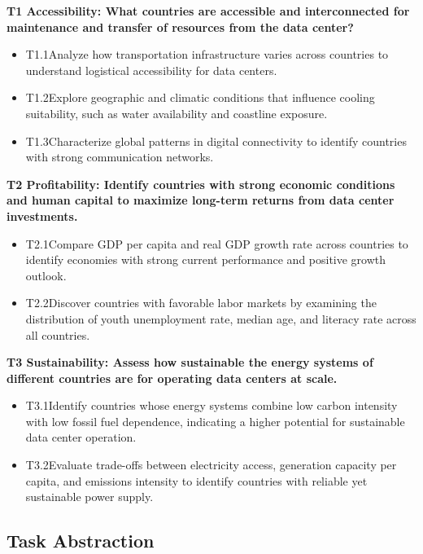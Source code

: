\documentclass{vgtc}                          %
\begin{document}
\textbf{T1 Accessibility: What countries are accessible and interconnected for maintenance and transfer of resources from the data center?}
\begin{itemize}
\item T1.1\quad Analyze how transportation infrastructure varies across countries to understand logistical accessibility for data centers.
\item T1.2\quad Explore geographic and climatic conditions that influence cooling suitability, such as water availability and coastline exposure.
\item T1.3\quad Characterize global patterns in digital connectivity to identify countries with strong communication networks.
\end{itemize}

\textbf{T2 Profitability: Identify countries with strong economic conditions and human capital to maximize long-term returns from data center investments.}
\begin{itemize}
\item T2.1\quad Compare GDP per capita and real GDP growth rate across countries to identify economies with strong current performance and positive growth outlook.
\item T2.2\quad Discover countries with favorable labor markets by examining the distribution of youth unemployment rate, median age, and literacy rate across all countries.
\end{itemize}

\textbf{T3 Sustainability: Assess how sustainable the energy systems of different countries are for operating data centers at scale.}
\begin{itemize}
\item T3.1\quad Identify countries whose energy systems combine low carbon intensity with low fossil fuel dependence, indicating a higher potential for sustainable data center operation.
\item T3.2\quad Evaluate trade-offs between electricity access, generation capacity per capita, and emissions intensity to identify countries with reliable yet sustainable power supply.
\end{itemize}

\subsection{Task Abstraction}
\end{document}
